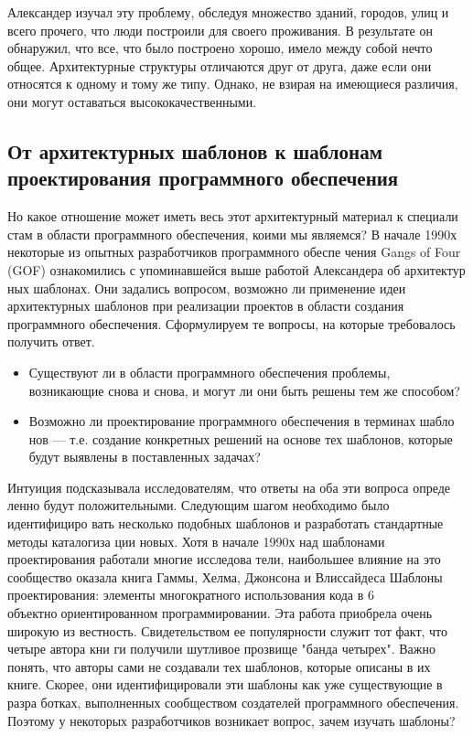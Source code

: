 \documentclass[10pt]{article}
\begin{document}
Александер изучал эту проблему, обследуя множество зданий, городов, улиц и всего прочего,
что люди построили для своего проживания. В результате он обнаружил,
что все, что было построено хорошо, имело между собой нечто общее.
Архитектурные структуры отличаются друг от друга, даже если они относятся к
одному и тому же типу. Однако, не взирая на имеющиеся различия, они могут оставаться
высококачественными.

\subsection{От архитектурных шаблонов к шаблонам проектирования программного обеспечения}
Но какое отношение может иметь весь этот архитектурный материал к специали
стам в области программного обеспечения, коими мы являемся?
В начале 1990х некоторые из опытных разработчиков программного обеспе
чения Gangs of Four (GOF) ознакомились с упоминавшейся выше работой Александера об архитектур
ных шаблонах.
Они задались вопросом, возможно ли применение идеи архитектурных шаблонов
при реализации проектов в области создания программного обеспечения.
Сформулируем те вопросы, на которые требовалось получить ответ.
\begin{itemize}
	\item Существуют ли в области программного обеспечения проблемы, возникающие
снова и снова, и могут ли они быть решены тем же способом?
	\item Возможно ли проектирование программного обеспечения в терминах шабло
нов — т.е. создание конкретных решений на основе тех шаблонов, которые
будут выявлены в поставленных задачах?
\end{itemize}
Интуиция подсказывала исследователям, что ответы на оба эти вопроса опреде
ленно будут положительными. Следующим шагом необходимо было идентифициро
вать несколько подобных шаблонов и разработать стандартные методы каталогиза
ции новых.
Хотя в начале 1990х над шаблонами проектирования работали многие исследова
тели, наибольшее влияние на это сообщество оказала книга Гаммы, Хелма, Джонсона
и Влиссайдеса Шаблоны проектирования: элементы многократного использования кода в
6
объектноориентированном программировании. Эта работа приобрела очень широкую из
вестность. Свидетельством ее популярности служит тот факт, что четыре автора кни
ги получили шутливое прозвище "банда четырех".
Важно понять, что авторы сами не создавали тех шаблонов, которые описаны в их
книге. Скорее, они идентифицировали эти шаблоны как уже существующие в разра
ботках, выполненных сообществом создателей программного обеспечения. Поэтому у некоторых
разработчиков возникает вопрос, зачем изучать шаблоны?
\end{document}
